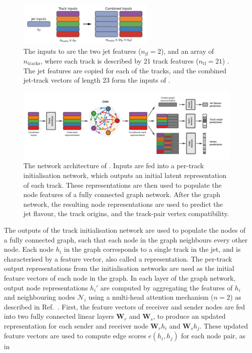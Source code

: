 \begin{figure}[!htbp]
    \centering
    \includegraphics[width=0.6\textwidth]{chapters/gnn_tagger/figs/inputs_diagram.png}
    \caption{The inputs to \GNN are the two jet features ($n_\text{jf} = 2$), and an array of $n_{\text{tracks}}$, where each track is described by 21 track features ($n_\text{tf} = 21$) \cite{ATL-PHYS-PUB-2022-027}. The jet features are copied for each of the tracks, and the combined jet-track vectors of length 23 form the inputs of \GNN.}
    \label{fig:model_input_array}
\end{figure}

\begin{figure}[!htbp]
    \centering
    \includegraphics[width=\textwidth]{chapters/gnn_tagger/figs/full_arch.pdf}
    \caption{The network architecture of \GNN. Inputs are fed into a per-track initialisation network, which outputs an initial latent representation of each track. These representations are then used to populate the node features of a fully connected graph network. After the graph network, the resulting node representations are used to predict the jet flavour, the track origins, and the track-pair vertex compatibility.}
    \label{fig:new_arch}
\end{figure}

The outputs of the track initialisation network are used to populate the nodes of a fully connected graph, such that each node in the graph neighbours every other node.
Each node $h_i$ in the graph corresponds to a single track in the jet, and is characterised by a feature vector, also called a representation.
The per-track output representations from the initialisation networks are used as the initial feature vectors of each node in the graph.
In each layer of the graph network, output node representations $h_i'$ are computed by aggregating the features of $h_i$ and neighbouring nodes $\mathcal{N}_i$ using a multi-head attention mechanism ($n=2$) as described in Ref.~\cite{2021arXiv210514491B,2017arXiv170603762V}.
First, the feature vectors of receiver and sender nodes are fed into two fully connected linear layers $\mathbf{W}_r$ and $\mathbf{W}_s$, to produce an updated representation for each sender and receiver node $\mathbf{W}_r h_i$ and $\mathbf{W}_s h_j$.
These updated feature vectors are used to compute edge scores $e(h_i, h_j)$ for each node pair, as in

